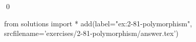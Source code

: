 
\begin{ex}
  \label{ex:2-81-polymorphism}
  
  \qed
\end{ex}
\begin{python0}
from solutions import *
add(label="ex:2-81-polymorphism",
    srcfilename='exercises/2-81-polymorphism/answer.tex')
\end{python0}
